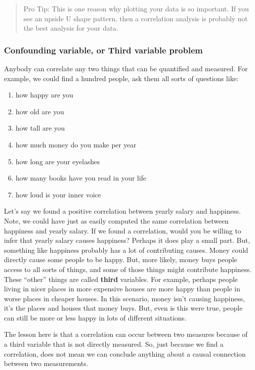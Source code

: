 \documentclass[
]{book}
\providecommand{\tightlist}{%
  \setlength{\itemsep}{0pt}\setlength{\parskip}{0pt}}
\begin{document}
\begin{quote}
Pro Tip: This is one reason why plotting your data is so important. If you see an upside U shape pattern, then a correlation analysis is probably not the best analysis for your data.
\end{quote}

\subsubsection{Confounding variable, or Third variable problem}\label{confounding-variable-or-third-variable-problem}

Anybody can correlate any two things that can be quantified and measured. For example, we could find a hundred people, ask them all sorts of questions like:

\begin{enumerate}
\def\labelenumi{\arabic{enumi}.}
\tightlist
\item
  how happy are you
\item
  how old are you
\item
  how tall are you
\item
  how much money do you make per year
\item
  how long are your eyelashes
\item
  how many books have you read in your life
\item
  how loud is your inner voice
\end{enumerate}

Let's say we found a positive correlation between yearly salary and happiness. Note, we could have just as easily computed the same correlation between happiness and yearly salary. If we found a correlation, would you be willing to infer that yearly salary causes happiness? Perhaps it does play a small part. But, something like happiness probably has a lot of contributing causes. Money could directly cause some people to be happy. But, more likely, money buys people access to all sorts of things, and some of those things might contribute happiness. These ``other'' things are called \textbf{third} variables. For example, perhaps people living in nicer places in more expensive houses are more happy than people in worse places in cheaper houses. In this scenario, money isn't causing happiness, it's the places and houses that money buys. But, even is this were true, people can still be more or less happy in lots of different situations.

The lesson here is that a correlation can occur between two measures because of a third variable that is not directly measured. So, just because we find a correlation, does not mean we can conclude anything about a causal connection between two measurements.
\end{document}

